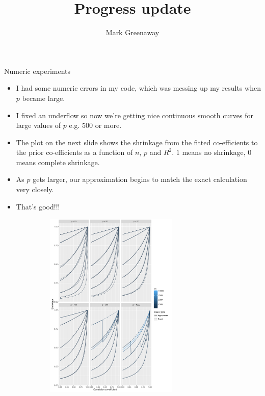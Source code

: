 \documentclass{beamer}
\title{Progress update}
\author{Mark Greenaway}
\begin{document}
\begin{frame}
	\titlepage
\end{frame}

\begin{frame}{Numeric experiments}
	\begin{itemize}
		\item I had some numeric errors in my code, which was messing up my results when $p$ became large.
		\item I fixed an underflow so now we're getting nice continuous smooth curves for large values of
		      $p$ e.g. $500$ or more.
		\item The plot on the next slide shows the shrinkage from the fitted co-efficients to the
		      prior co-efficients as a function of $n$, $p$ and $R^2$. $1$ means no shrinkage, $0$ means complete
		      shrinkage.
		\item As $p$ gets larger, our approximation begins to match the exact calculation very closely.
		\item That's good!!!
	\end{itemize}
\end{frame}

\begin{frame}
	\begin{figure}
		\includegraphics[width=9cm, height=9cm]{Chapter_3_shrinkage.pdf}
	\end{figure}
\end{frame}
\end{document}
